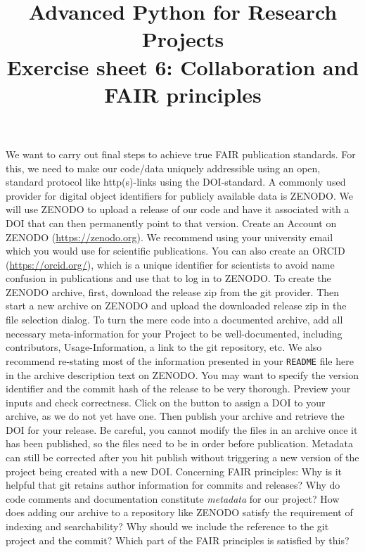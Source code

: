 \documentclass[]{erlangen-problemset}
\title{{\Large Advanced Python for Research Projects} \\[0.3cm] 
Exercise sheet 6: Collaboration and FAIR principles}
\begin{document}


\begin{problem}[title={FAIR principles - Findability}]
\noindent We want to carry out final steps to achieve true FAIR publication standards. 
For this, we need to make our code/data uniquely addressible using an open, standard protocol like http(s)-links using the DOI-standard. 
A commonly used provider for digital object identifiers for publicly available data is ZENODO. 
We will use ZENODO to upload a release of our code and have it associated with a DOI that can then permanently point to that version.
\Question Create an Account on ZENODO (\url{https://zenodo.org}). 
We recommend using your university email which you would use for scientific publications.
You can also create an ORCID (\url{https://orcid.org/}), which is a unique identifier for scientists to avoid name confusion in publications and use that to log in to ZENODO.
\Question To create the ZENODO archive, first, download the release zip from the git provider. 
Then start a new archive on ZENODO and upload the downloaded release zip in the file selection dialog. 
\Question To turn the mere code into a documented archive, add all necessary meta-information for your Project to be well-documented, including contributors, Usage-Information, a link to the git repository, etc. 
We also recommend re-stating most of the information presented in your \texttt{README} file here in the archive description text on ZENODO.
You may want to specify the version identifier and the commit hash of the release to be very thorough.
\Question Preview your inputs and check correctness.
Click on the button to assign a DOI to your archive, as we do not yet have one. 
Then publish your archive and retrieve the DOI for your release. 
Be careful, you cannot modify the files in an archive once it has been published, so the files need to be in order before publication. 
Metadata can still be corrected after you hit publish without triggering a new version of the project being created with a new DOI.
\Question Concerning FAIR principles: Why is it helpful that git retains author information for commits and releases?
\Question Why do code comments and documentation constitute \emph{metadata} for our project?
\Question How does adding our archive to a repository like ZENODO satisfy the requirement of indexing and searchability?
\Question Why should we include the reference to the git project and the commit? Which part of the FAIR principles is satisfied by this?
\end{problem}
\end{document}
